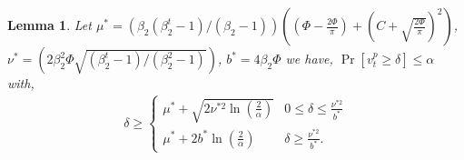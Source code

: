 \documentclass[letterpaper]{article} %
\newtheorem{lemma}[theorem]{Lemma}
\begin{document}
\begin{lemma}
\label{lemma:gaussian_concentration_on_z}
Let $\mu^{*} = (\beta_2(\beta_2^t-1)/(\beta_2-1))((\Phi-\frac{2\Phi}{\pi})+(C+\sqrt{\frac{2\Phi}{\pi}})^2)$, $\nu^{*} = (2\beta_2^2\Phi\sqrt{(\beta_2^t-1)/ (\beta_2^2-1)})$, $b^{*}=4\beta_2\Phi$ we have,
    $\Pr[v_t^p \geq \delta] \leq \alpha$ with,
    \begin{align*}
        \delta \geq
        \begin{cases}
            \mu^{*} + \sqrt{2\nu^{*2}\ln{(\frac{2}{\alpha})}}
            & 0 \leq \delta  \leq \frac{\nu^{*2}}{b^{*}} \\
            \mu^{*} + 2b^{*}\ln{(\frac{2}{\alpha})}
            & \delta   \geq \frac{\nu^{*2}}{b^{*}}.
        \end{cases}
    \end{align*}
\end{lemma}
\end{document}
